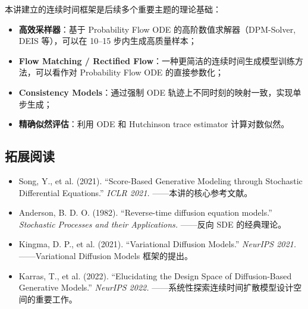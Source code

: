 本讲建立的连续时间框架是后续多个重要主题的理论基础：

\begin{itemize}
    \item \textbf{高效采样器}：基于 Probability Flow ODE 的高阶数值求解器（DPM-Solver, DEIS 等），可以在 10--15 步内生成高质量样本；
    \item \textbf{Flow Matching / Rectified Flow}：一种更简洁的连续时间生成模型训练方法，可以看作对 Probability Flow ODE 的直接参数化；
    \item \textbf{Consistency Models}：通过强制 ODE 轨迹上不同时刻的映射一致，实现单步生成；
    \item \textbf{精确似然评估}：利用 ODE 和 Hutchinson trace estimator 计算对数似然。
\end{itemize}

\subsection{拓展阅读}

\begin{itemize}
    \item Song, Y., et al. (2021). ``Score-Based Generative Modeling through Stochastic Differential Equations.'' \textit{ICLR 2021.} ——本讲的核心参考文献。
    \item Anderson, B. D. O. (1982). ``Reverse-time diffusion equation models.'' \textit{Stochastic Processes and their Applications.} ——反向 SDE 的经典理论。
    \item Kingma, D. P., et al. (2021). ``Variational Diffusion Models.'' \textit{NeurIPS 2021.} ——Variational Diffusion Models 框架的提出。
    \item Karras, T., et al. (2022). ``Elucidating the Design Space of Diffusion-Based Generative Models.'' \textit{NeurIPS 2022.} ——系统性探索连续时间扩散模型设计空间的重要工作。
\end{itemize}



